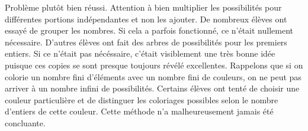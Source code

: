 Problème plutôt bien réussi. Attention à bien multiplier les possibilités pour différentes portions indépendantes et non les ajouter. De nombreux élèves ont essayé de grouper les nombres. Si cela a parfois fonctionné, ce n'était nullement nécessaire. D'autres élèves ont fait des arbres de possibilités pour les premiers entiers. Si ce n'était pas nécéssaire, c'était visiblement une très bonne idée puisque ces copies se sont presque toujours révélé excellentes. Rappelons que si on colorie un nombre fini d'éléments avec un nombre fini de couleurs, on ne peut pas arriver à un nombre infini de possibilités. Certains élèves ont tenté de choisir une couleur particulière et de distinguer les coloriages possibles selon le nombre d'entiers de cette couleur. Cette méthode n'a malheureusement jamais été concluante.